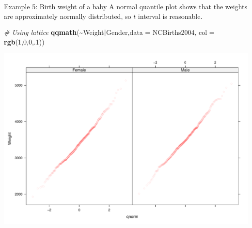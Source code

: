 \documentclass[
  ignorenonframetext,
]{beamer}
\newenvironment{Shaded}{\begin{snugshade}}{\end{snugshade}}
\newcommand{\AttributeTok}[1]{\textcolor[rgb]{0.13,0.29,0.53}{#1}}
\newcommand{\CommentTok}[1]{\textcolor[rgb]{0.56,0.35,0.01}{\textit{#1}}}
\newcommand{\DecValTok}[1]{\textcolor[rgb]{0.00,0.00,0.81}{#1}}
\newcommand{\FunctionTok}[1]{\textcolor[rgb]{0.13,0.29,0.53}{\textbf{#1}}}
\newcommand{\NormalTok}[1]{#1}
\newcommand{\SpecialCharTok}[1]{\textcolor[rgb]{0.81,0.36,0.00}{\textbf{#1}}}
\begin{document}
\begin{frame}[fragile]{Example 5: Birth weight of a baby}
\protect\hypertarget{example-5-birth-weight-of-a-baby-2}{}
A normal quantile plot shows that the weights are approximately normally
distributed, so \(t\) interval is reasonable. \tiny

\begin{Shaded}
\begin{Highlighting}[]
\CommentTok{\# Using lattice}
\FunctionTok{qqmath}\NormalTok{(}\SpecialCharTok{\textasciitilde{}}\NormalTok{Weight}\SpecialCharTok{|}\NormalTok{Gender,}\AttributeTok{data =}\NormalTok{ NCBirths2004, }\AttributeTok{col =} \FunctionTok{rgb}\NormalTok{(}\DecValTok{1}\NormalTok{,}\DecValTok{0}\NormalTok{,}\DecValTok{0}\NormalTok{,.}\DecValTok{1}\NormalTok{))}
\end{Highlighting}
\end{Shaded}

\begin{center}\includegraphics[width=0.7\linewidth,height=0.5\textheight]{Week10_Lect_files/figure-beamer/unnamed-chunk-58-1} \end{center}
\normalsize
\end{frame}
\end{document}
